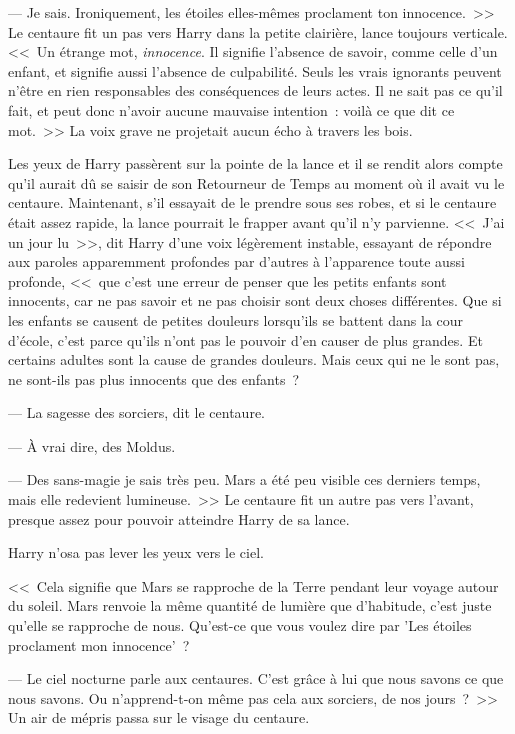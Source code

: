 --- Je sais. Ironiquement, les étoiles elles-mêmes proclament ton innocence.~>> Le centaure fit un pas vers Harry dans la petite clairière, lance toujours verticale. <<~Un étrange mot, \emph{innocence}. Il signifie l'absence de savoir, comme celle d'un enfant, et signifie aussi l'absence de culpabilité. Seuls les vrais ignorants peuvent n'être en rien responsables des conséquences de leurs actes. Il ne sait pas ce qu'il fait, et peut donc n'avoir aucune mauvaise intention~: voilà ce que dit ce mot.~>> La voix grave ne projetait aucun écho à travers les bois.

Les yeux de Harry passèrent sur la pointe de la lance et il se rendit alors compte qu'il aurait dû se saisir de son Retourneur de Temps au moment où il avait vu le centaure. Maintenant, s'il essayait de le prendre sous ses robes, et si le centaure était assez rapide, la lance pourrait le frapper avant qu'il n'y parvienne. <<~J'ai un jour lu~>>, dit Harry d'une voix légèrement instable, essayant de répondre aux paroles apparemment profondes par d'autres à l'apparence toute aussi profonde, <<~que c'est une erreur de penser que les petits enfants sont innocents, car ne pas savoir et ne pas choisir sont deux choses différentes. Que si les enfants se causent de petites douleurs lorsqu'ils se battent dans la cour d'école, c'est parce qu'ils n'ont pas le pouvoir d'en causer de plus grandes. Et certains adultes sont la cause de grandes douleurs. Mais ceux qui ne le sont pas, ne sont-ils pas plus innocents que des enfants~?

--- La sagesse des sorciers, dit le centaure.

--- À vrai dire, des Moldus.

--- Des sans-magie je sais très peu. Mars a été peu visible ces derniers temps, mais elle redevient lumineuse.~>> Le centaure fit un autre pas vers l'avant, presque assez pour pouvoir atteindre Harry de sa lance.

Harry n'osa pas lever les yeux vers le ciel.

<<~Cela signifie que Mars se rapproche de la Terre pendant leur voyage autour du soleil. Mars renvoie la même quantité de lumière que d'habitude, c'est juste qu'elle se rapproche de nous. Qu'est-ce que vous voulez dire par 'Les étoiles proclament mon innocence'~?

--- Le ciel nocturne parle aux centaures. C'est grâce à lui que nous savons ce que nous savons. Ou n'apprend-t-on même pas cela aux sorciers, de nos jours~?~>> Un air de mépris passa sur le visage du centaure.

